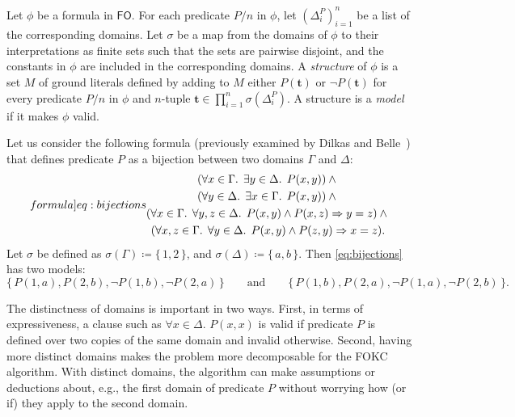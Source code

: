 \documentclass[a4paper,UKenglish,cleveref, autoref, thm-restate]{lipics-v2021}
\newcommand{\FO}{$\mathsf{FO}$}
\begin{document}
\begin{definition}\label{def:model}
  Let $\phi$ be a formula in \FO{}. For each predicate $P/n$ in $\phi$, let
  ${(\Delta_{i}^{P})}_{i=1}^{n}$ be a list of the corresponding domains. Let
  $\sigma$ be a map from the domains of $\phi$ to their interpretations as
  finite sets such that the sets are pairwise disjoint, and the constants in
  $\phi$ are included in the corresponding domains. A \emph{structure} of $\phi$
  is a set $M$ of ground literals defined by adding to $M$ either
  $P(\mathbf{t})$ or $\neg P(\mathbf{t})$ for every predicate $P/n$ in $\phi$
  and $n$-tuple $\mathbf{t} \in \prod_{i=1}^{n} \sigma(\Delta_{i}^{P})$. A
  structure is a \emph{model} if it makes $\phi$ valid.
\end{definition}

\begin{example}\label{example:bijections}
  Let us consider the following formula (previously examined by Dilkas and
  Belle~\cite{DBLP:conf/kr/DilkasB23}) that defines predicate $P$ as a bijection
  between two domains $\Gamma$ and $\Delta$:
  \begin{equation}\label[formula]{eq:bijections}
    \begin{gathered}
      (\forall x \in \Gamma\text{. }\exists y \in \Delta\text{. }P(x, y))\land{}\\
      (\forall y \in \Delta\text{. }\exists x \in \Gamma\text{. }P(x, y))\land{}\\
      (\forall x \in \Gamma\text{. }\forall y, z \in \Delta\text{. }P(x, y) \land P(x, z) \Rightarrow y = z)\land{}\\
      (\forall x, z \in \Gamma\text{. }\forall y \in \Delta\text{. }P(x, y) \land P(z, y) \Rightarrow x = z).
    \end{gathered}
  \end{equation}
  Let $\sigma$ be defined as $\sigma(\Gamma) \coloneqq \{\, 1, 2\,\}$, and
  $\sigma(\Delta) \coloneqq \{\,a, b\,\}$. Then \cref{eq:bijections} has two
  models:
  \[
    \{\, P(1, a), P(2, b), \neg P(1, b), \neg P(2, a) \,\} \qquad \text{and} \qquad \{\, P(1, b), P(2, a), \neg P(1, a), \neg P(2, b) \,\}.
  \]
\end{example}

\begin{remark*}
  The distinctness of domains is important in two ways. First, in terms of
  expressiveness, a clause such as $\forall x \in \Delta\text{. }P(x, x)$ is
  valid if predicate $P$ is defined over two copies of the same domain and
  invalid otherwise. Second, having more distinct domains makes the problem more
  decomposable for the FOKC algorithm. With distinct domains, the algorithm can
  make assumptions or deductions about, e.g., the first domain of predicate $P$
  without worrying how (or if) they apply to the second domain.
\end{remark*}
\end{document}
